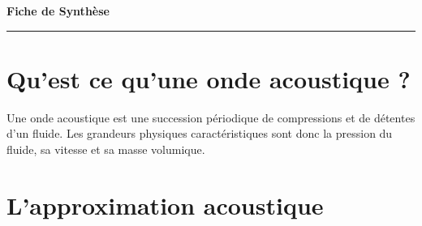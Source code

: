 \documentclass[a4paper]{article}
\begin{document}
\centerline{\huge{\textbf{Fiche de Synthèse}}}
\begin{center}
 \rule{1\linewidth}{1pt}
\end{center}


\section{Qu'est ce qu'une onde acoustique ?}
Une onde acoustique est une succession périodique de compressions et de détentes d'un fluide. Les grandeurs physiques caractéristiques sont donc la pression du fluide, sa vitesse et sa masse volumique.

\section{L'approximation acoustique}
\end{document}
